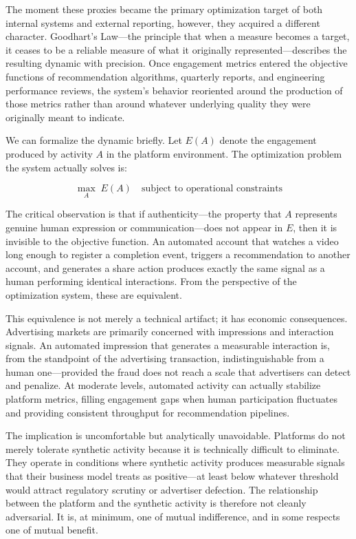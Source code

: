 \documentclass[12pt, a4paper]{article}
\begin{document}
The moment these proxies became the primary optimization target of both internal systems and external reporting, however, they acquired a different character. Goodhart's Law---the principle that when a measure becomes a target, it ceases to be a reliable measure of what it originally represented---describes the resulting dynamic with precision. Once engagement metrics entered the objective functions of recommendation algorithms, quarterly reports, and engineering performance reviews, the system's behavior reoriented around the production of those metrics rather than around whatever underlying quality they were originally meant to indicate.

We can formalize the dynamic briefly. Let $E(A)$ denote the engagement produced by activity $A$ in the platform environment. The optimization problem the system actually solves is:

\[
\max_{A} \; E(A) \quad \text{subject to operational constraints}
\]

The critical observation is that if authenticity---the property that $A$ represents genuine human expression or communication---does not appear in $E$, then it is invisible to the objective function. An automated account that watches a video long enough to register a completion event, triggers a recommendation to another account, and generates a share action produces exactly the same signal as a human performing identical interactions. From the perspective of the optimization system, these are equivalent.

This equivalence is not merely a technical artifact; it has economic consequences. Advertising markets are primarily concerned with impressions and interaction signals. An automated impression that generates a measurable interaction is, from the standpoint of the advertising transaction, indistinguishable from a human one---provided the fraud does not reach a scale that advertisers can detect and penalize. At moderate levels, automated activity can actually stabilize platform metrics, filling engagement gaps when human participation fluctuates and providing consistent throughput for recommendation pipelines.

The implication is uncomfortable but analytically unavoidable. Platforms do not merely tolerate synthetic activity because it is technically difficult to eliminate. They operate in conditions where synthetic activity produces measurable signals that their business model treats as positive---at least below whatever threshold would attract regulatory scrutiny or advertiser defection. The relationship between the platform and the synthetic activity is therefore not cleanly adversarial. It is, at minimum, one of mutual indifference, and in some respects one of mutual benefit.
\end{document}
